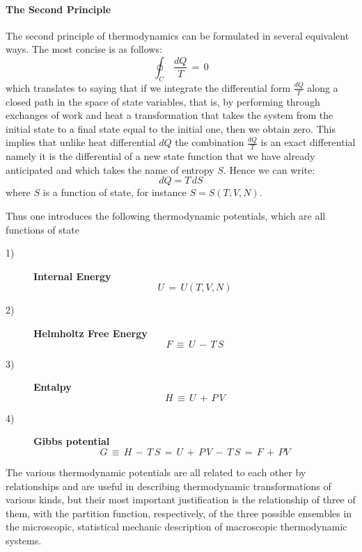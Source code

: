 \documentclass[10pt,a4paper]{article}
\begin{document}
\paragraph{\sc The Second Principle} The second principle of thermodynamics can be formulated in several equivalent ways. The most concise is as follows:
\begin{equation}\label{principiumsecundum}
    \oint_C \, \frac{dQ}{T} \, =\,0
\end{equation}
which translates to saying that if we integrate the differential form
$\frac{dQ}{T}$ along a closed path in the space of state variables, that is, by performing through exchanges of work and heat a transformation that takes the system from the initial state to a final state equal to the initial one, then we obtain zero.  This implies that unlike heat differential $dQ$ the combination
$\frac{dQ}{T}$  is an exact differential namely it is the differential of a new state function that
we have already anticipated and which takes the name of entropy $S$. Hence we can write:
\begin{equation}\label{principiumsecundumcan}
    dQ=T \, dS
\end{equation}
where $S$ is  a function of state, for instance $S=S(T,V,N)$.
\par
Thus one introduces the following thermodynamic potentials, which are all functions of state
\begin{description}
  \item[1)] \textbf{Internal Energy}
  \begin{equation}\label{internalE}
    U \, = \, U(T,V,N)
  \end{equation}
\item[2)] \textbf{Helmholtz Free Energy}
\begin{equation}\label{Helmolzo}
    F \, \equiv \, U \, - \, T\,S
\end{equation}
  \item[3)] \textbf{Entalpy}
\begin{equation}\label{entalpo}
    H \, \equiv \, U \, + \, P\,V
\end{equation}
  \item[4)] \textbf{Gibbs potential}
\begin{equation}\label{ghibbo}
    G \, \equiv \, H \, - \, T\,S \, = \, U \, + \, P\, V \, - \,
    T\, S \, = \, F \, + \, PV
\end{equation}
\end{description}
The various thermodynamic potentials are all related to each other by relationships and are useful in describing thermodynamic transformations of various kinds, but their most important justification is the relationship of three of them,  with the partition function, respectively, of the three possible ensembles in the microscopic, statistical mechanic description of macroscopic thermodynamic systems.
\end{document}
